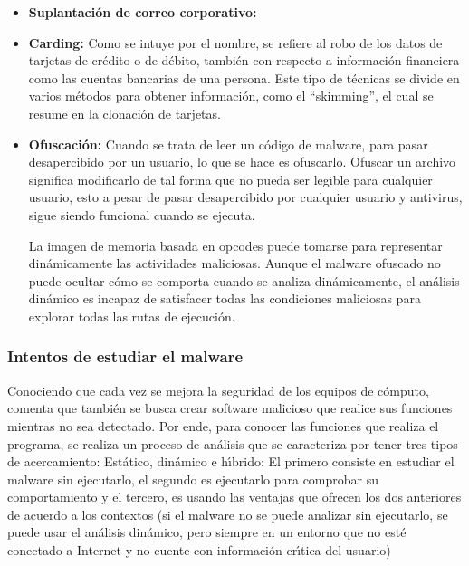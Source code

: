\begin{itemize}
	\item \textbf{Suplantaci\'on de correo corporativo:}

	\item \textbf{Carding:}
	      Como se intuye por el nombre, se refiere al robo de los datos de tarjetas de
	      cr\'edito o de d\'ebito, tambi\'en con respecto a informaci\'on financiera como las
	      cuentas bancarias de una persona. Este tipo de t\'ecnicas se divide en varios
	      m\'etodos para obtener informaci\'on, como el ``skimming'', el cual se resume en
	      la clonaci\'on de tarjetas. \parencite{Mosquera2019}

	\item \textbf{Ofuscaci\'on:}
	      Cuando se trata de leer un c\'odigo de malware, para pasar desapercibido por
	      un usuario, lo que se hace es ofuscarlo. Ofuscar un archivo significa
	      modificarlo de tal forma que no pueda ser legible para cualquier usuario,
	      esto a pesar de pasar desapercibido por cualquier usuario y antivirus, sigue
	      siendo funcional cuando se ejecuta.
	      \begin{displayquote}
		      La imagen de memoria basada en opcodes puede tomarse para representar
		      din\'amicamente las actividades maliciosas. Aunque el malware ofuscado no
		      puede ocultar c\'omo se comporta cuando se analiza din\'amicamente, el
		      an\'alisis din\'amico es incapaz de satisfacer todas las condiciones
		      maliciosas para explorar todas las rutas de ejecuci\'on.
		      \parencite{Aboaoja2022}
	      \end{displayquote}
\end{itemize}

\subsubsection{Intentos de estudiar el malware}

Conociendo que cada vez se mejora la seguridad de los equipos de c\'omputo,
\textcite{Aboaoja2022} comenta que tambi\'en se busca crear software malicioso que
realice sus funciones mientras no sea detectado. Por ende, para conocer las
funciones que realiza el programa, se realiza un proceso de an\'alisis que se
caracteriza por tener tres tipos de acercamiento: Est\'atico, din\'amico e h\'{\i}brido:
El primero consiste en estudiar el malware sin ejecutarlo, el segundo es
ejecutarlo para comprobar su comportamiento y el tercero, es usando las ventajas
que ofrecen los dos anteriores de acuerdo a los contextos (si el malware no
se puede analizar sin ejecutarlo, se puede usar el an\'alisis din\'amico, pero
siempre en un entorno que no est\'e conectado a Internet y no cuente con
informaci\'on cr\'{\i}tica del usuario)


